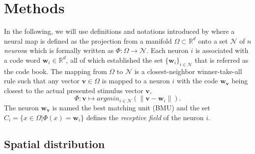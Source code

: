 \section{Methods}

In the following, we will use definitions and notations introduced by
\citet{rougier:2011} where a neural map is defined as the projection from a
manifold $\Omega \subset \mathbb{R}^d$ onto a set $\mathcal{N}$ of $n$ {\em
  neuron}s which is formally written as $\Phi : \Omega \rightarrow
\mathcal{N}$. Each neuron $i$ is associated with a code word $\mathbf{w}_i \in
\mathbb{R}^d$, all of which established the set $\{\mathbf{w}_i\}_{i \in
  \mathcal{N}}$ that is referred as the code book. The mapping from $\Omega$ to
$\mathcal{N}$ is a closest-neighbor winner-take-all rule such that any vector
$\mathbf{v} \in \Omega$ is mapped to a neuron $i$ with the code
$\mathbf{w}_\mathbf{v}$ being closest to the actual presented stimulus vector
$\mathbf{v}$,
\begin{equation}
\Phi : \mathbf{v} \mapsto argmin_{i \in \mathcal{N}} (\lVert \mathbf{v} -
\mathbf{w}_i \rVert).
\label{eq:psi}
\end{equation}
The neuron $\mathbf{w}_\mathbf{v}$ is named the best matching unit (BMU) and
the set $C_i = \{x \in \Omega | \Phi(x) = \mathbf{w}_i \}$ defines the {\em
  receptive field} of the neuron $i$.


\subsection{Spatial distribution} %

